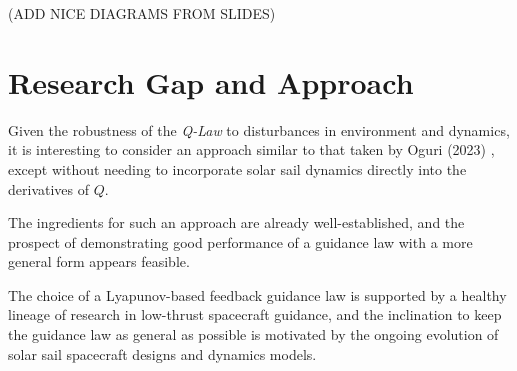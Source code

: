 (ADD NICE DIAGRAMS FROM SLIDES)

\section{Research Gap and Approach}
Given the robustness of the \textit{Q-Law} to disturbances in environment and dynamics, it is interesting to consider an approach similar to that taken by Oguri (2023) \cite{oguri2023solar}, except without needing to incorporate solar sail dynamics directly into the derivatives of $Q$.

The ingredients for such an approach are already well-established, and the prospect of demonstrating good performance of a guidance law with a more general form appears feasible.

The choice of a Lyapunov-based feedback guidance law is supported by a healthy lineage of research in low-thrust spacecraft guidance, and the inclination to keep the guidance law as general as possible is motivated by the ongoing evolution of solar sail spacecraft designs and dynamics models.